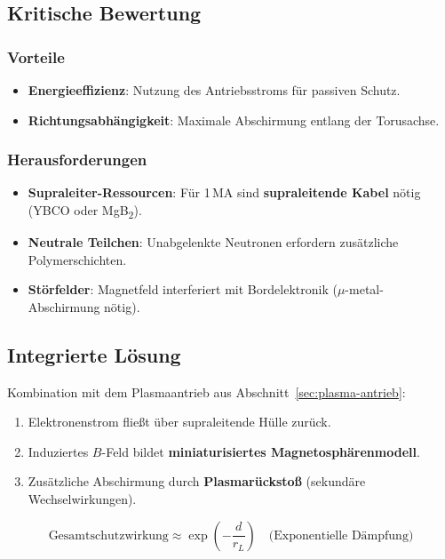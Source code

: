 \subsection{Kritische Bewertung}
\subsubsection*{Vorteile}
\begin{itemize}
    \item \textbf{Energieeffizienz}: Nutzung des Antriebsstroms für passiven Schutz.
    \item \textbf{Richtungsabhängigkeit}: Maximale Abschirmung entlang der Torusachse.
\end{itemize}

\subsubsection*{Herausforderungen}
\begin{itemize}
    \item \textbf{Supraleiter-Ressourcen}: Für 1\,MA sind \textbf{supraleitende Kabel} nötig (YBCO oder MgB\textsubscript{2}).
    \item \textbf{Neutrale Teilchen}: Unabgelenkte Neutronen erfordern zusätzliche Polymerschichten.
    \item \textbf{Störfelder}: Magnetfeld interferiert mit Bordelektronik ($\mu$-metal-Abschirmung nötig).
\end{itemize}

\subsection{Integrierte Lösung}
Kombination mit dem Plasmaantrieb aus Abschnitt~\ref{sec:plasma-antrieb}:
\begin{enumerate}
    \item Elektronenstrom fließt über supraleitende Hülle zurück.
    \item Induziertes $B$-Feld bildet \textbf{miniaturisiertes Magnetosphärenmodell}.
    \item Zusätzliche Abschirmung durch \textbf{Plasmarückstoß} (sekundäre Wechselwirkungen).
\end{enumerate}

\begin{equation}
    \text{Gesamtschutzwirkung} \approx \exp\left(-\frac{d}{r_L}\right) \quad \text{(Exponentielle Dämpfung)}
\end{equation}
